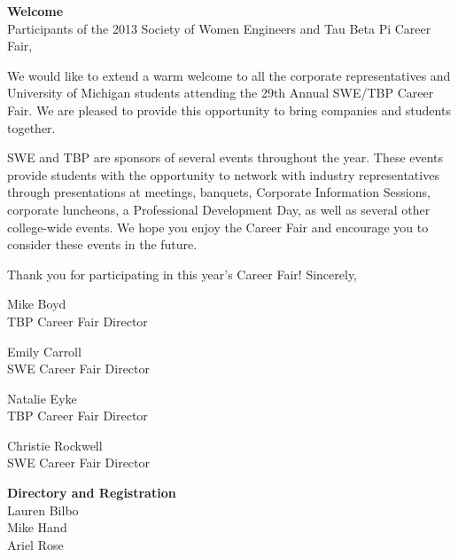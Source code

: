 \documentclass{article}
\begin{document}

\startforewardsection
\begin{center}
{ \fontsize{16}{19}\selectfont \bf Welcome}\\
Participants of the 2013 Society of Women Engineers and Tau Beta Pi Career Fair, 

We would like to extend a warm welcome to all the corporate representatives and 
University of Michigan students attending the 29th Annual SWE/TBP Career Fair. We 
are pleased to provide this opportunity to bring companies and students together. 

SWE and TBP are sponsors of several events throughout the year. These events 
provide students with the opportunity to network with industry representatives through 
presentations at meetings, banquets, Corporate Information Sessions, corporate 
luncheons, a Professional Development Day, as well as several other college-wide 
events. We hope you enjoy the Career Fair and encourage you to consider these 
events in the future. 
 
Thank you for participating in this year's Career Fair!
Sincerely, \begin{multicols}{2}
	\begin{minipage}{\columnwidth}
			Mike Boyd\\
			TBP Career Fair Director\\
			\end{minipage}
\begin{minipage}{\columnwidth}
			Emily Carroll\\
			SWE Career Fair Director\\
			\end{minipage}
\begin{minipage}{\columnwidth}
			Natalie Eyke\\
			TBP Career Fair Director\\
			\end{minipage}
\begin{minipage}{\columnwidth}
			Christie Rockwell\\
			SWE Career Fair Director\\
			\end{minipage}
\end{multicols}\begin{multicols}{2}
	\begin{minipage}{\columnwidth}
	{\bf Directory and Registration}\\
	Lauren Bilbo\\
	Mike Hand\\
	Ariel Rose\\
	

\end{minipage}
\end{multicols}
\end{center}
\end{document}
